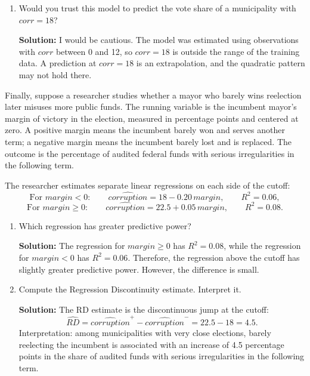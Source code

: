 \documentclass[11pt]{exam}
\begin{document}
\begin{questions}
\begin{enumerate}[leftmargin = 0.5cm, label = (\alph*), rightmargin = 0.2cm]
    \item Would you trust this model to predict the vote share of a municipality with $corr=18$?

    \begin{solutionorbox}[7cm]
    \textbf{Solution:} I would be cautious. The model was estimated using observations with $corr$ between 0 and 12, so $corr=18$ is outside the range of the training data. A prediction at $corr=18$ is an extrapolation, and the quadratic pattern may not hold there.
    \end{solutionorbox}
\end{enumerate}

\question[2.5]
Finally, suppose a researcher studies whether a mayor who barely wins reelection later misuses more public funds. The running variable is the incumbent mayor's margin of victory in the election, measured in percentage points and centered at zero. A positive margin means the incumbent barely won and serves another term; a negative margin means the incumbent barely lost and is replaced. The outcome is the percentage of audited federal funds with serious irregularities in the following term.

The researcher estimates separate linear regressions on each side of the cutoff:
\[
\text{For } margin<0: \qquad \widehat{corruption}=18-0.20\,margin, \qquad R^2=0.06,
\]
\[
\text{For } margin\geq 0: \qquad \widehat{corruption}=22.5+0.05\,margin, \qquad R^2=0.08.
\]

\begin{enumerate}[leftmargin = 0.5cm, label = (\alph*), rightmargin = 0.2cm]
    \item Which regression has greater predictive power?

    \begin{solutionorbox}[2cm]
    \textbf{Solution:} The regression for $margin\geq 0$ has $R^2=0.08$, while the regression for $margin<0$ has $R^2=0.06$. Therefore, the regression above the cutoff has slightly greater predictive power. However, the difference is small.
    \end{solutionorbox}

    \item Compute the Regression Discontinuity estimate. Interpret it.

    \begin{solutionorbox}[5.2cm]
    \textbf{Solution:} The RD estimate is the discontinuous jump at the cutoff:
    \[
    \widehat{RD}=\widehat{corruption}^{+}-\widehat{corruption}^{-}=22.5-18=4.5.
    \]
    Interpretation: among municipalities with very close elections, barely reelecting the incumbent is associated with an increase of 4.5 percentage points in the share of audited funds with serious irregularities in the following term.
    \end{solutionorbox}


\end{enumerate}
\end{questions}
\end{document}
